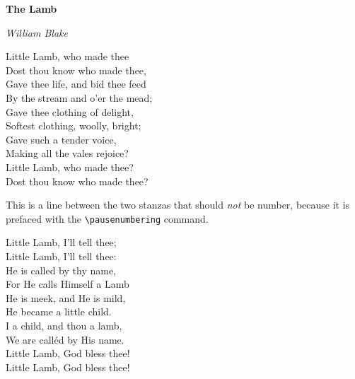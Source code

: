 \documentclass{book}
\begin{document}
\textbf{The Lamb}

\emph{William Blake}

\begingroup
\beginnumbering
\autopar
{}

Little Lamb, who made thee\\
Dost thou know who made thee,\\
Gave thee life, and bid thee feed\\
By the stream and o'er the mead;\\
Gave thee clothing of delight,\\
Softest clothing, woolly, bright;\\
Gave  such a tender voice,\\
Making all the vales rejoice?\\
Little Lamb, who made thee?\\
Dost thou know who made thee?

\pausenumbering

This is a line between the two stanzas that should \emph{not} be number, because it is prefaced with the \verb|\pausenumbering| command.

\resumenumbering

Little Lamb, I'll tell thee;\\
Little Lamb, I'll tell thee:\\
He is called by thy name,\\
For He calls Himself a Lamb\\
He is meek, and He is mild,\\
He became a little child.\\
I a child, and thou a lamb,\\
We are call\'ed by His name.\\
Little Lamb, God bless thee!\\
Little Lamb, God bless thee!

\endnumbering
\endgroup
\end{document}
